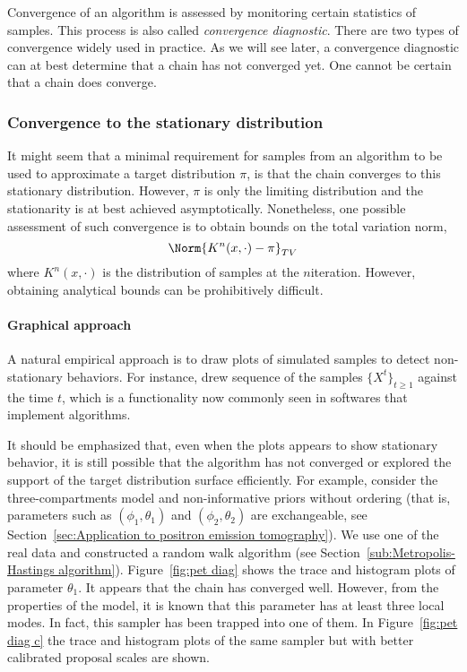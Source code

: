 Convergence of an \mcmc algorithm is assessed by monitoring certain statistics of samples. This process is also called \emph{convergence diagnostic}. There are two types of convergence \cite[][chap.~12]{Robert:2004tn} widely used in practice. As we will see later, a convergence diagnostic can at best determine that a chain has not converged yet. One cannot be certain that a chain does converge.

\subsubsection{Convergence to the stationary distribution}
\label{ssub:Convergence to the stationary distribution}

It might seem that a minimal requirement for samples from an \mcmc algorithm to be used to approximate a target distribution $\pi$, is that the chain converges to this stationary distribution. However, $\pi$ is only the limiting distribution and the stationarity is at best achieved asymptotically. Nonetheless, one possible assessment of such convergence is to obtain bounds on the total variation norm,
\begin{equation*}
  \Norm{K^n(x,\cdot)-\pi}_{TV}
\end{equation*}
where $K^n(x,\cdot)$ is the distribution of samples at the $n$\xth iteration. However, obtaining analytical bounds can be prohibitively difficult.

\paragraph{Graphical approach}

A natural empirical approach is to draw plots of simulated samples to detect non-stationary behaviors. For instance, \cite{Gelfand:1990it} drew sequence of the samples $\{X^t\}_{t\ge1}$ against the time $t$, which is a functionality now commonly seen in softwares that implement \mcmc algorithms.

It should be emphasized that, even when the plots appears to show stationary behavior, it is still possible that the algorithm has not converged or explored the support of the target distribution surface efficiently. For example, consider the three-compartments \pet model and non-informative priors without ordering (that is, parameters such as $(\phi_1,\theta_1)$ and $(\phi_2,\theta_2)$ are exchangeable, see Section~\ref{sec:Application to positron emission tomography}). We use one of the real data  and constructed a random walk algorithm (see Section~\ref{sub:Metropolis-Hastings algorithm}). Figure~\ref{fig:pet diag} shows the trace and histogram plots of parameter $\theta_1$. It appears that the \mcmc chain has converged well. However, from the properties of the model, it is known that this parameter has at least three local modes. In fact, this sampler has been trapped into one of them. In Figure~\ref{fig:pet diag c} the trace and histogram plots of the same sampler but with better calibrated proposal scales are shown.


